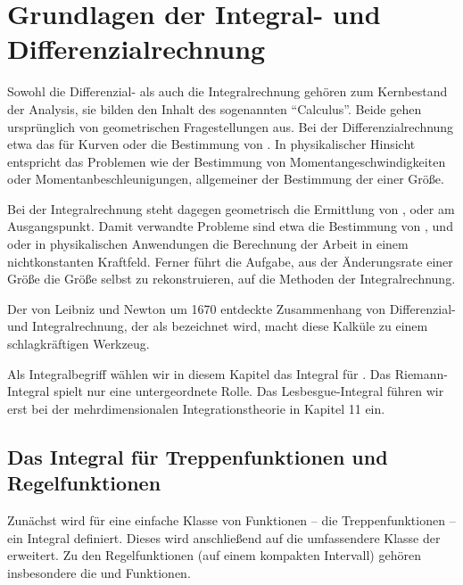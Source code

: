 \chapter{Grundlagen der Integral- und Differenzialrechnung}

Sowohl die Differenzial- als auch die Integralrechnung 
gehören zum Kernbestand der Analysis, sie bilden den Inhalt des 
sogenannten "`Calculus"'. Beide gehen ursprünglich von geometrischen 
Fragestellungen aus. Bei der Differenzialrechnung etwa das 
 für Kurven oder die Bestimmung von 
. In physikalischer 
Hinsicht entspricht das Problemen wie der Bestimmung von 
Momentangeschwindigkeiten oder Momentanbeschleunigungen, allgemeiner 
der Bestimmung der  einer Größe.

Bei der Integralrechnung steht dagegen geometrisch die 
Ermittlung von ,  
oder  am Ausgangspunkt. Damit verwandte 
Probleme sind etwa die Bestimmung von , 
 und  oder in 
physikalischen Anwendungen die Berechnung der Arbeit in einem 
nichtkonstanten Kraftfeld. Ferner führt die Aufgabe, aus der
Änderungsrate einer Größe die Größe selbst zu rekonstruieren, 
auf die Methoden der Integralrechnung.  

Der von Leibniz und Newton um 1670 entdeckte Zusammenhang von 
Differenzial- und Integralrechnung, der als  bezeichnet wird, macht 
diese Kalküle zu einem schlagkräftigen Werkzeug. 

Als Integralbegriff wählen wir in diesem Kapitel das 
Integral für . Das Riemann-Integral spielt nur 
eine untergeordnete Rolle. Das Lesbesgue-Integral führen wir erst
bei der  mehrdimensionalen Integrationstheorie in 
Kapitel 11 ein. 

\section{Das Integral für Treppenfunktionen und Regelfunktionen}

Zunächst wird für eine einfache Klasse von Funktionen 
-- die Treppenfunktionen -- ein Integral definiert. Dieses wird anschließend 
auf die umfassendere Klasse der  erweitert. 
Zu den Regelfunktionen (auf einem kompakten Intervall) gehören insbesondere 
die  und  Funktionen. 

